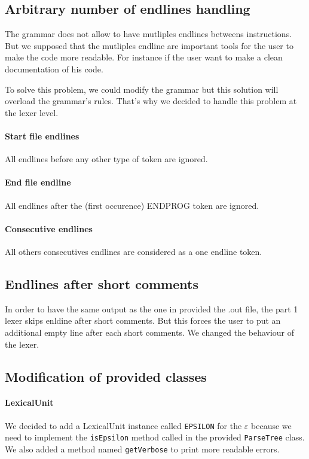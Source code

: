 \documentclass[12pt]{article}
\begin{document}
\subsection{Arbitrary number of endlines handling}
The grammar does not allow to have mutliples endlines betweens instructions. But we supposed that
the mutliples endline are important tools for the user to make the code more readable.
For instance if the user want to make a clean documentation of his code.

To solve this problem, we could modify the grammar but
this solution will overload the grammar's rules.
That's why we decided to handle this problem at the lexer level.

\paragraph{Start file endlines}
All endlines before any other type of token are ignored.

\paragraph{End file endline}
All endlines after the (first occurence) ENDPROG token are ignored.

\paragraph{Consecutive endlines}
All others consecutives endlines are considered as a one endline token.

\subsection{Endlines after short comments}
In order to have the same output as the one in provided the .out file, the part 1 lexer
skips enldine after short comments. But this forces the user to put an additional empty line after
each short comments. We changed the behaviour of the lexer.

\subsection{Modification of provided classes}

\paragraph{LexicalUnit}
We decided to add a LexicalUnit instance called \texttt{EPSILON} for the $ \varepsilon $ because we need to implement the
\texttt{isEpsilon} method called in the provided \texttt{ParseTree} class. We also added
a method named \texttt{getVerbose} to print more readable errors.
\end{document}
